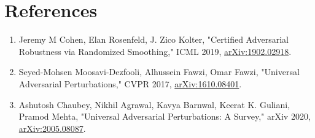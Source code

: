 \documentclass{article}
\theoremstyle{plain}
\theoremstyle{definition}
\theoremstyle{remark}
\begin{document}
\section*{References}
\begin{enumerate}
    \item Jeremy M Cohen, Elan Rosenfeld, J. Zico Kolter, "Certified Adversarial Robustness via Randomized Smoothing," ICML 2019, \href{https://arxiv.org/abs/1902.02918}{arXiv:1902.02918}.
    \item Seyed-Mohsen Moosavi-Dezfooli, Alhussein Fawzi, Omar Fawzi, "Universal Adversarial Perturbations," CVPR 2017, \href{https://arxiv.org/abs/1610.08401}{arXiv:1610.08401}.
    \item Ashutosh Chaubey, Nikhil Agrawal, Kavya Barnwal, Keerat K. Guliani, Pramod Mehta, "Universal Adversarial Perturbations: A Survey," arXiv 2020, \href{https://arxiv.org/abs/2005.08087}{arXiv:2005.08087}.
\end{enumerate}


%
%
\end{document}
